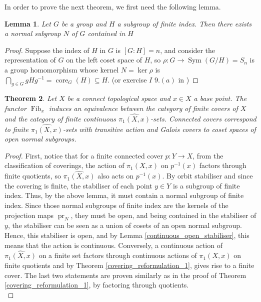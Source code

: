 \documentclass{article}
\theoremstyle{plain}
\newtheorem{theorem}{Theorem}[subsection]
\newtheorem{lemma}[theorem]{Lemma}
\theoremstyle{definition}
\DeclareMathOperator{\Fib}{Fib}
\DeclareMathOperator{\Sym}{Sym}
\DeclareMathOperator{\core}{core}
\DeclareMathOperator{\pr}{pr}
\begin{document}
\noindent In order to prove the next theorem, we first need the following lemma.

\begin{lemma}
    Let $G$ be a group and $H$ a subgroup of finite index. Then there exists a normal subgroup $N$ of $G$ contained in $H$
\end{lemma}
\begin{proof}
    Suppose the index of $H$ in $G$ is $[G:H]=n$, and consider the representation of $G$ on the left coset space of $H$, so $\rho:G\rightarrow \Sym(G/H) = S_n$ is a group homomorphism whose kernel $N=\ker\rho$ is $\bigcap_{g\in G} gHg^{-1} = \core_G(H) \subseteq H$. (or exercise $I$ $9.(a)$ in \cite{Lang_algebra})
\end{proof}

\begin{theorem}
\label{covering_reformulation_2}
    Let $X$ be a connect topological space and $x\in X$ a base point. 
    The functor $\Fib_x$ induces an equivalence between the category of finite covers of $X$ and the category of finite continuous $\widehat{\pi_1(X,x)}$-sets.
    Connected covers correspond to finite $\widehat{\pi_1(X,x)}$-sets with transitive action and Galois covers to coset spaces of open normal subgroups.
\end{theorem}
\begin{proof}
    First, notice that for a finite connected cover $p:Y\rightarrow X$, from the classification of coverings, the action of $\pi_1(X,x)$ on $p^{-1}(x)$ factors through finite quotients, 
    so $\widehat{\pi_1(X,x)}$ also acts on $p^{-1}(x)$.
    By orbit stabiliser and since the covering is finite, the stabiliser of each point $y\in Y$ is a subgroup of finite index. 
    Thus, by the above lemma, it must contain a normal subgroup of finite index.
    Since those normal subgroups of finite index are the kernels of the projection maps $\pr_N$, they must be open, and being contained in the stabiliser of $y$, the stabiliser can be seen as a union of cosets of an open normal subgroup.
    Hence, this stabiliser is open, and by Lemma \ref{continuous_open_stabiliser}, this means that the action is continuous.
    Conversely, a continuous action of $\widehat{\pi_1(X,x)}$ on a finite set factors through continuous actions of $\pi_1(X,x)$ on finite quotients and by Theorem \ref{covering_reformulation_1}, gives rise to a finite cover.
    The last two statements are proven similarly as in the proof of Theorem \ref{covering_reformulation_1}, by factoring through quotients.\\
\end{proof}
\end{document}
